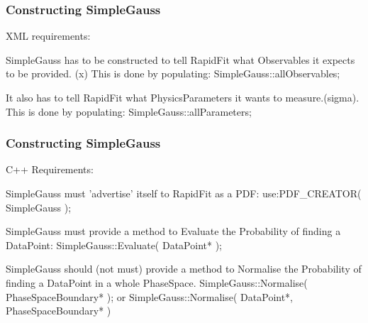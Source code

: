 \documentclass{beamer}
\begin{document}
\begin{frame}
\frametitle{Constructing SimpleGauss}

XML requirements:\newline\newline

SimpleGauss has to be constructed to tell RapidFit what Observables it expects to be provided. (x)\newline
This is done by populating: SimpleGauss::allObservables;\newline\newline


It also has to tell RapidFit what PhysicsParameters it wants to measure.(sigma).\newline
This is done by populating: SimpleGauss::allParameters;\newline\newline

\end{frame}

\begin{frame}
\frametitle{Constructing SimpleGauss}
C++ Requirements:\newline

SimpleGauss must 'advertise' itself to RapidFit as a PDF:\newline
use:\newline  PDF\_CREATOR( SimpleGauss );\newline

SimpleGauss must provide a method to Evaluate the Probability of finding a DataPoint:\newline
SimpleGauss::Evaluate( DataPoint* );\newline

SimpleGauss should (not must) provide a method to Normalise the Probability of finding a DataPoint in a whole PhaseSpace.\newline\newline
SimpleGauss::Normalise( PhaseSpaceBoundary* ); or
SimpleGauss::Normalise( DataPoint*, PhaseSpaceBoundary* )


\end{frame}
\end{document}
